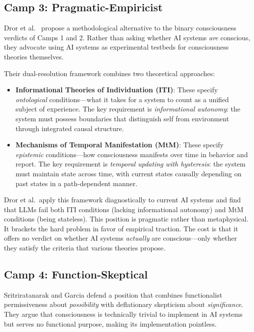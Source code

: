 \subsection{Camp 3: Pragmatic-Empiricist}

Dror et al.\ \cite{dror2025dual} propose a methodological alternative to the binary
consciousness verdicts of Camps 1 and 2. Rather than asking whether AI systems \emph{are}
conscious, they advocate using AI systems as experimental testbeds for consciousness
theories themselves.

Their dual-resolution framework combines two theoretical approaches:

\begin{itemize}[leftmargin=2em]
\item \textbf{Informational Theories of Individuation (ITI)}: These specify \emph{ontological}
      conditions---what it takes for a system to count as a unified subject of experience.
      The key requirement is \emph{informational autonomy}: the system must possess boundaries
      that distinguish self from environment through integrated causal structure.
\item \textbf{Mechanisms of Temporal Manifestation (MtM)}: These specify \emph{epistemic}
      conditions---how consciousness manifests over time in behavior and report. The key
      requirement is \emph{temporal updating with hysteresis}: the system must maintain state
      across time, with current states causally depending on past states in a path-dependent
      manner.
\end{itemize}

Dror et al.\ apply this framework diagnostically to current AI systems and find that LLMs
fail both ITI conditions (lacking informational autonomy) and MtM conditions (being
stateless). This position is pragmatic rather than metaphysical. It brackets the hard problem
\cite{chalmers1995facing} in favor of empirical traction. The cost is that it offers no
verdict on whether AI systems \emph{actually} are conscious---only whether they satisfy the
criteria that various theories propose.

\subsection{Camp 4: Function-Skeptical}

Sritriratanarak and Garcia \cite{sritriratanarak2025consciousness} defend a position that
combines functionalist permissiveness about \emph{possibility} with deflationary skepticism
about \emph{significance}. They argue that consciousness is technically trivial to implement
in AI systems but serves no functional purpose, making its implementation pointless.

